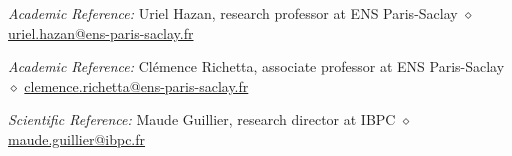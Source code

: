 \documentclass[
	10pt,
]{style} %
\begin{document}
\begin{rReferences}
	\vspace{-0.5em}
    \item \textit{Academic Reference:} Uriel Hazan, research professor at ENS Paris-Saclay $\diamond$ \href{mailto:uriel.hazan@ens-paris-saclay.fr}{uriel.hazan@ens-paris-saclay.fr}
	\item \textit{Academic Reference:} Clémence Richetta, associate professor at ENS Paris-Saclay $\diamond$ \href{mailto:clemence.richetta@ens-paris-saclay.fr}{clemence.richetta@ens-paris-saclay.fr}
	\item \textit{Scientific Reference:} Maude Guillier, research director at IBPC $\diamond$ \href{mailto:maude.guillier@ibpc.fr}{maude.guillier@ibpc.fr}
\end{rReferences}
\end{document}
